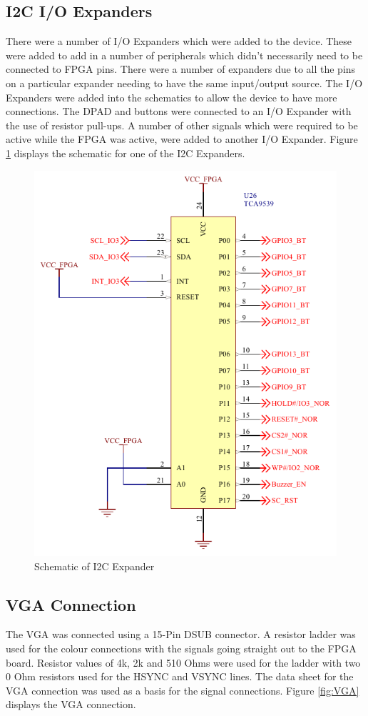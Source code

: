 \subsection{I2C I/O Expanders}

	There were a number of I/O Expanders which were added to the device. These were added to add in a number of peripherals which didn't necessarily need to be connected to FPGA pins. There were a number of expanders due to all the pins on a particular expander needing to have the same input/output source. 
The I/O Expanders were added into the schematics to allow the device to have more connections. The DPAD and buttons were connected to an I/O Expander with the use of resistor pull-ups. A number of other signals which were required to be active while the FPGA was active, were added to another I/O Expander.
Figure \ref{fig:I2C} displays the schematic for one of the I2C Expanders. 

\begin{figure}
	\includegraphics[width=0.5\linewidth]{Figures/I2C_Expander.pdf}\centering
	\caption{Schematic of I2C Expander}
	\label{fig:I2C}
\end{figure}

\subsection{VGA Connection}
\label{chap:VGA}

	The VGA was connected using a 15-Pin DSUB connector. 
A resistor ladder was used for the colour connections with the signals going straight out to the FPGA board.
Resistor values of 4k, 2k and 510 Ohms were used for the ladder with two 0 Ohm resistors used for the HSYNC and VSYNC lines. 
The data sheet for the VGA connection was used as a basis for the signal connections. 
Figure \ref{fig:VGA} displays the VGA connection. 


